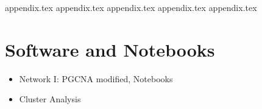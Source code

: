 \newpage

\begin{appendices}

{appendix.tex}
{appendix.tex}
{appendix.tex}
{appendix.tex}
{appendix.tex}

\chapter{Software and Notebooks} \label{s:ap:software}

\begin{itemize}
    \item Network I: PGCNA modified, Notebooks
    \item Cluster Analysis
\end{itemize}

\end{appendices}
